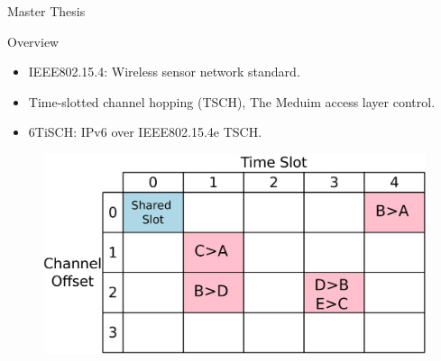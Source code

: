 \documentclass{beamer}
\begin{document}
\begin{frame}{Master Thesis}

\begin{minipage}[t]{0.48\linewidth}

\begin{block}{Overview}
    \begin{itemize}
    \item IEEE802.15.4: Wireless sensor network standard. 
    \item<2-> Time-slotted channel hopping (TSCH), The Meduim access layer control.  
     \item<3-> 6TiSCH: IPv6 over IEEE802.15.4e TSCH. 
     \end{itemize}
    \end{block}
\end{minipage}\hfill
\begin{minipage}[t]{0.48\linewidth}
\centering
\begin{figure}[p]

\item<2-> \includegraphics[width=\linewidth]{TSCH.jpeg}

\end{figure}

\end{minipage}
\end{frame}
\end{document}
